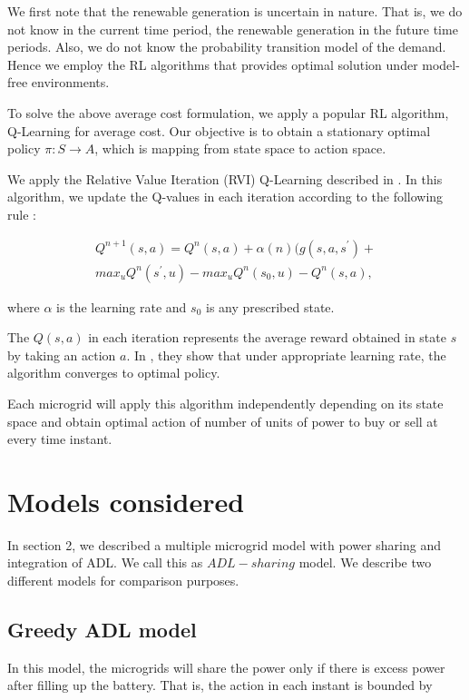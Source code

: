 We first note that the renewable generation is uncertain in nature. That is, we do not know in the current time period, the renewable generation in the future time periods. Also, we do not know the probability transition model of the demand. Hence we employ the RL algorithms that provides optimal solution under model-free environments.

To solve the above average cost formulation, we apply a popular RL algorithm, Q-Learning for average cost. Our objective is to obtain a stationary optimal policy $\pi : S \rightarrow A$, which is mapping from state space to action space.  

We apply the Relative Value Iteration (RVI) Q-Learning described in \cite{avgcost}. In this algorithm, we update the Q-values in each iteration according to the following rule :

\begin{align}
Q^{n+1}(s,a) = Q^{n}(s,a) + \alpha(n)(g(s,a,s^{'}) + \\ max_{u} Q^{n}(s^{'},u) - max_{u} Q^{n}(s_{0},u) - Q^{n}(s,a),
\end{align}

where $\alpha$ is the learning rate and $s_{0}$ is any prescribed state.

The $Q(s,a)$ in each iteration represents the average reward obtained in state $s$ by taking an action $a$. In \cite{avgcost}, they show that under appropriate learning rate, the algorithm converges to optimal policy. 

Each microgrid will apply this algorithm independently depending on its state space and obtain optimal action of number of units of power to buy or sell at every time instant. 

\section{Models considered}

In section 2, we described a multiple microgrid model with power sharing and integration of ADL. We call this as $ADL-sharing$ model. We describe two different models for comparison purposes. 

\subsection{Greedy ADL model}

In this model, the microgrids will share the power only if there is excess power after filling up the battery. That is, the action in each instant is bounded by   

